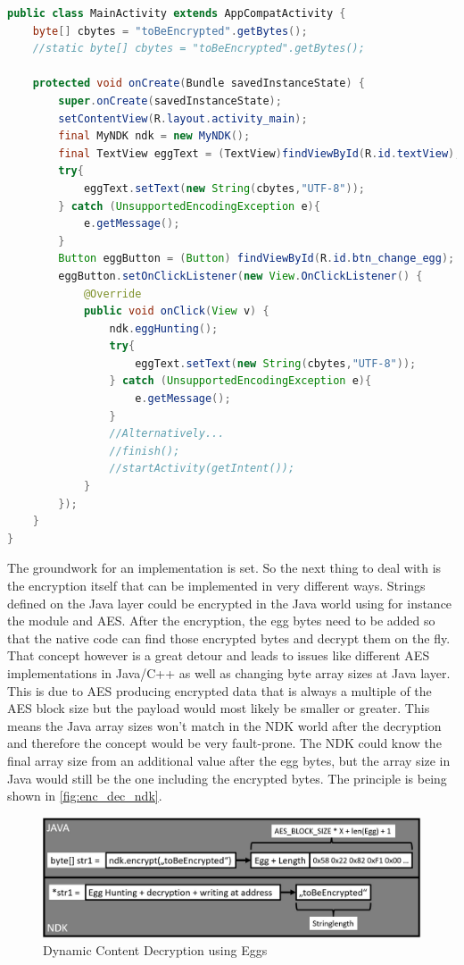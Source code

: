 \begin{lstlisting}[language=Java, caption=Native Code String Change, label=native_string_change]
public class MainActivity extends AppCompatActivity {
    byte[] cbytes = "toBeEncrypted".getBytes();
    //static byte[] cbytes = "toBeEncrypted".getBytes();

    protected void onCreate(Bundle savedInstanceState) {
        super.onCreate(savedInstanceState);
        setContentView(R.layout.activity_main);
        final MyNDK ndk = new MyNDK();
        final TextView eggText = (TextView)findViewById(R.id.textView);
        try{
            eggText.setText(new String(cbytes,"UTF-8"));
        } catch (UnsupportedEncodingException e){
            e.getMessage();
        }
        Button eggButton = (Button) findViewById(R.id.btn_change_egg);
        eggButton.setOnClickListener(new View.OnClickListener() {
            @Override
            public void onClick(View v) {
                ndk.eggHunting();
                try{
                    eggText.setText(new String(cbytes,"UTF-8"));
                } catch (UnsupportedEncodingException e){
                    e.getMessage();
                }
                //Alternatively...
                //finish();
                //startActivity(getIntent());
            }
        });
    }
}
\end{lstlisting}
The groundwork for an implementation is set.
So the next thing to deal with is the encryption itself that can be
implemented in very different ways. Strings defined on the Java layer could be
encrypted in the Java world using for instance the 
module and AES. After the encryption, the egg bytes need to
be added so that the native code can find those encrypted bytes
and decrypt them on the fly. That concept however is a great detour and
leads to issues like different AES implementations in Java/C++ as well as
changing byte array sizes at Java layer. This is due to AES producing encrypted data
that is always a multiple of the AES block size but the payload would
most likely be smaller or greater. This means the Java array sizes won't match in the NDK world after the decryption and therefore the concept would be very fault-prone. The NDK could know the final array size from
an additional value after the egg bytes, but the array size in Java would
still be the one including the encrypted bytes.
The principle is being shown in \autoref{fig:enc_dec_ndk}.
\begin{figure}[htb]
  \centering
  \includegraphics[scale=0.4]{figures/enc_dec_ndk}
  \caption[Dynamic Content Decryption using Eggs]{Dynamic Content Decryption using Eggs}
  \label{fig:enc_dec_ndk}
\end{figure}

